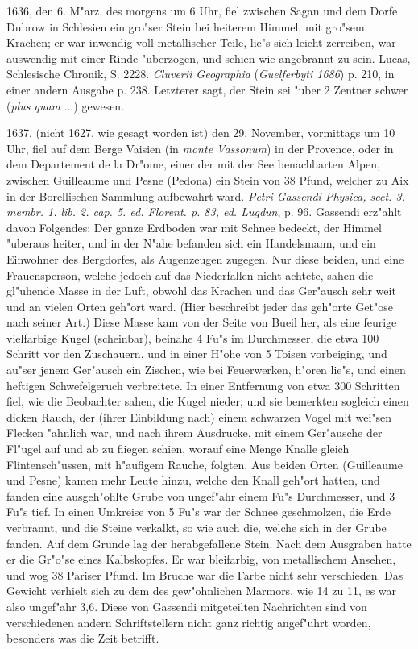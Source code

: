 \documentclass[a4paper, 11pt, oneside, polutonikogreek, german]{article}
\begin{document}
1636, den 6. M"arz, des morgens um 6 Uhr, fiel zwischen Sagan und dem Dorfe Dubrow in Schlesien ein gro"ser Stein bei heiterem Himmel, mit gro"sem Krachen; er war inwendig voll metallischer Teile, lie"s sich leicht zerreiben, war auswendig mit einer Rinde "uberzogen, und schien wie angebrannt zu sein. Lucas, Schlesische Chronik, S. 2228. \emph{Cluverii Geographia} (\emph{Guelferbyti 1686}) p. 210, in einer andern Ausgabe p. 238. Letzterer sagt, der Stein sei "uber 2 Zentner schwer (\emph{plus quam} ...) gewesen.

1637, (nicht 1627, wie gesagt worden ist) den 29. November, vormittags um 10 Uhr, fiel auf dem Berge Vaisien (in \emph{monte Vassonum}) in der Provence, oder in dem Departement de la Dr"ome, einer der mit der See benachbarten Alpen, zwischen Guilleaume und Pesne (Pedona) ein Stein von 38 Pfund, welcher zu Aix in der Borellischen Sammlung aufbewahrt ward. \emph{Petri Gassendi Physica, sect. 3. membr. 1. lib. 2. cap. 5. ed. Florent. p. 83, ed. Lugdun}, p. 96. Gassendi erz"ahlt davon Folgendes: Der ganze Erdboden war mit Schnee bedeckt, der Himmel "uberaus heiter, und in der N"ahe befanden sich ein Handelsmann, und ein Einwohner des Bergdorfes, als Augenzeugen zugegen. Nur diese beiden, und eine Frauensperson, welche jedoch auf das Niederfallen nicht achtete, sahen die gl"uhende Masse in der Luft, obwohl das Krachen und das Ger"ausch sehr weit und an vielen Orten geh"ort ward. (Hier beschreibt jeder das geh"orte Get"ose nach seiner Art.) Diese Masse kam von der Seite von Bueil her, als eine feurige vielfarbige Kugel (scheinbar), beinahe 4 Fu"s im Durchmesser, die etwa 100 Schritt vor den Zuschauern, und in einer H"ohe von 5 Toisen vorbeiging, und au"ser jenem Ger"ausch ein Zischen, wie bei Feuerwerken, h"oren lie"s, und einen heftigen Schwefelgeruch verbreitete. In einer Entfernung von etwa 300 Schritten fiel, wie die Beobachter sahen, die Kugel nieder, und sie bemerkten sogleich einen dicken Rauch, der (ihrer Einbildung nach) einem schwarzen Vogel mit wei"sen Flecken "ahnlich war, und nach ihrem Ausdrucke, mit einem Ger"ausche der Fl"ugel auf und ab zu fliegen schien, worauf eine Menge Knalle gleich Flintensch"ussen, mit h"aufigem Rauche, folgten. Aus beiden Orten (Guilleaume und Pesne) kamen mehr Leute hinzu, welche den Knall geh"ort hatten, und fanden eine ausgeh"ohlte Grube von ungef"ahr einem Fu"s Durchmesser, und 3 Fu"s tief. In einen Umkreise von 5 Fu"s war der Schnee geschmolzen, die Erde verbrannt, und die Steine verkalkt, so wie auch die, welche sich in der Grube fanden. Auf dem Grunde lag der herabgefallene Stein. Nach dem Ausgraben hatte er die Gr"o"se eines Kalbskopfes. Er war bleifarbig, von metallischem Ansehen, und wog 38 Pariser Pfund. Im Bruche war die Farbe nicht sehr verschieden. Das Gewicht verhielt sich zu dem des gew"ohnlichen Marmors, wie 14 zu 11, es war also ungef"ahr 3,6. Diese von Gassendi mitgeteilten Nachrichten sind von verschiedenen andern Schriftstellern nicht ganz richtig angef"uhrt worden, besonders was die Zeit betrifft.
\end{document}
